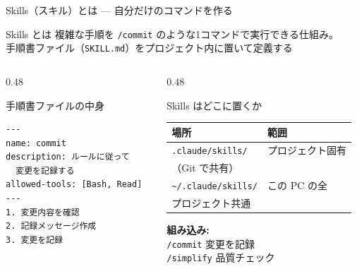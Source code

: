 \documentclass[aspectratio=169, 14pt]{beamer}
\newcommand{\api}[1]{\texttt{\color{sfblue}#1}}
\begin{document}
\begin{frame}[fragile]{Skills（スキル）とは — 自分だけのコマンドを作る}
  \begin{block}{Skills とは}
    {\small 複雑な手順を \api{/commit} のような1コマンドで実行できる仕組み。\\
    手順書ファイル（\texttt{SKILL.md}）をプロジェクト内に置いて定義する}
  \end{block}

  \begin{columns}[T]
    \begin{column}{0.48\textwidth}
      \begin{block}{手順書ファイルの中身}
        \begin{lstlisting}[language={}, numbers=none]
---
name: commit
description: ルールに従って
  変更を記録する
allowed-tools: [Bash, Read]
---
1. 変更内容を確認
2. 記録メッセージ作成
3. 変更を記録
        \end{lstlisting}
      \end{block}
    \end{column}
    \begin{column}{0.48\textwidth}
      \begin{alertblock}{Skills はどこに置くか}
        {\scriptsize
        \begin{tabular}{lp{22mm}}
          \hline
          \textbf{場所} & \textbf{範囲} \\
          \hline
          \texttt{.claude/skills/} &
            プロジェクト固有\\（Git で共有） \\
          \texttt{\textasciitilde/.claude/skills/} &
            この PC の全\\プロジェクト共通 \\
          \hline
        \end{tabular}
        }

        \vspace{0.3em}

        {\scriptsize
        \textbf{組み込み:} \\
        \api{/commit} 変更を記録 \\
        \api{/simplify} 品質チェック
        }
      \end{alertblock}
    \end{column}
  \end{columns}
\end{frame}
\end{document}
